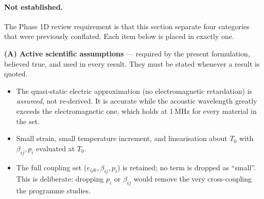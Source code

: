 \documentclass[11pt]{article}
\theoremstyle{plain}
\begin{document}
\paragraph{Not established.}
The Phase 1D review requirement is that this section separate four categories
that were previously conflated. Each item below is placed in exactly one.

\medskip
\textbf{(A) Active scientific assumptions} --- required by the present
formulation, believed true, and used in every result. They must be stated
whenever a result is quoted.
\begin{itemize}
  \item The quasi-static electric approximation (no electromagnetic retardation)
        is \emph{assumed}, not re-derived. It is accurate while the acoustic
        wavelength greatly exceeds the electromagnetic one, which holds at 1\,MHz
        for every material in the set.
  \item Small strain, small temperature increment, and linearisation about
        $T_0$ with $\beta_{ij},p_i$ evaluated at $T_0$.
  \item The full coupling set ($e_{ijk},\beta_{ij},p_i$) is retained; no term is
        dropped as ``small''. This is deliberate: dropping $p_i$ or
        $\beta_{ij}$ would remove the very cross-coupling the programme studies.
\end{itemize}
\end{document}
